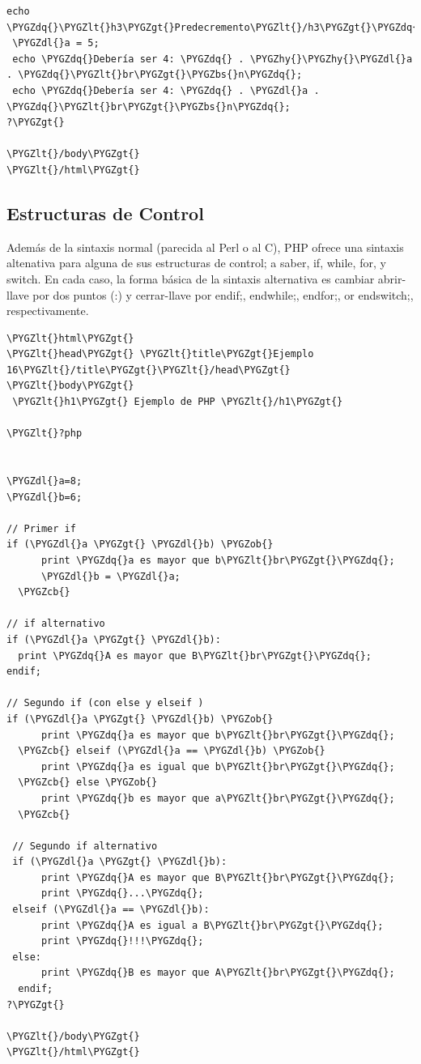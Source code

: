 \documentclass[a5paper,10pt,spanish]{sphinxmanual}
\def\PYGZbs{\char`\\}
\def\PYGZob{\char`\{}
\def\PYGZcb{\char`\}}
\def\PYGZlt{\char`\<}
\def\PYGZgt{\char`\>}
\def\PYGZdl{\char`\$}
\def\PYGZhy{\char`\-}
\def\PYGZdq{\char`\"}
\begin{document}
\begin{Verbatim}[commandchars=\\\{\}]
 echo \PYGZdq{}\PYGZlt{}h3\PYGZgt{}Predecremento\PYGZlt{}/h3\PYGZgt{}\PYGZdq{};
 \PYGZdl{}a = 5;
 echo \PYGZdq{}Debería ser 4: \PYGZdq{} . \PYGZhy{}\PYGZhy{}\PYGZdl{}a . \PYGZdq{}\PYGZlt{}br\PYGZgt{}\PYGZbs{}n\PYGZdq{};
 echo \PYGZdq{}Debería ser 4: \PYGZdq{} . \PYGZdl{}a . \PYGZdq{}\PYGZlt{}br\PYGZgt{}\PYGZbs{}n\PYGZdq{};
?\PYGZgt{}

\PYGZlt{}/body\PYGZgt{}
\PYGZlt{}/html\PYGZgt{}
\end{Verbatim}


\subsection{Estructuras de Control}
\label{Tutorial1_Conceptos.md:estructuras-de-control}
Además de la sintaxis normal (parecida al Perl o al C), PHP ofrece una
sintaxis altenativa para alguna de sus estructuras de control; a saber,
if, while, for, y switch. En cada caso, la forma básica de la sintaxis
alternativa es cambiar abrir-llave por dos puntos (:) y cerrar-llave por
endif;, endwhile;, endfor;, or endswitch;, respectivamente.

\begin{Verbatim}[commandchars=\\\{\}]
\PYGZlt{}html\PYGZgt{}
\PYGZlt{}head\PYGZgt{} \PYGZlt{}title\PYGZgt{}Ejemplo 16\PYGZlt{}/title\PYGZgt{}\PYGZlt{}/head\PYGZgt{}
\PYGZlt{}body\PYGZgt{}
 \PYGZlt{}h1\PYGZgt{} Ejemplo de PHP \PYGZlt{}/h1\PYGZgt{}

\PYGZlt{}?php


\PYGZdl{}a=8;
\PYGZdl{}b=6;

// Primer if
if (\PYGZdl{}a \PYGZgt{} \PYGZdl{}b) \PYGZob{}
      print \PYGZdq{}a es mayor que b\PYGZlt{}br\PYGZgt{}\PYGZdq{};
      \PYGZdl{}b = \PYGZdl{}a;
  \PYGZcb{}

// if alternativo
if (\PYGZdl{}a \PYGZgt{} \PYGZdl{}b):
  print \PYGZdq{}A es mayor que B\PYGZlt{}br\PYGZgt{}\PYGZdq{};
endif;

// Segundo if (con else y elseif )
if (\PYGZdl{}a \PYGZgt{} \PYGZdl{}b) \PYGZob{}
      print \PYGZdq{}a es mayor que b\PYGZlt{}br\PYGZgt{}\PYGZdq{};
  \PYGZcb{} elseif (\PYGZdl{}a == \PYGZdl{}b) \PYGZob{}
      print \PYGZdq{}a es igual que b\PYGZlt{}br\PYGZgt{}\PYGZdq{};
  \PYGZcb{} else \PYGZob{}
      print \PYGZdq{}b es mayor que a\PYGZlt{}br\PYGZgt{}\PYGZdq{};
  \PYGZcb{}

 // Segundo if alternativo
 if (\PYGZdl{}a \PYGZgt{} \PYGZdl{}b):
      print \PYGZdq{}A es mayor que B\PYGZlt{}br\PYGZgt{}\PYGZdq{};
      print \PYGZdq{}...\PYGZdq{};
 elseif (\PYGZdl{}a == \PYGZdl{}b):
      print \PYGZdq{}A es igual a B\PYGZlt{}br\PYGZgt{}\PYGZdq{};
      print \PYGZdq{}!!!\PYGZdq{};
 else:
      print \PYGZdq{}B es mayor que A\PYGZlt{}br\PYGZgt{}\PYGZdq{};
  endif;
?\PYGZgt{}

\PYGZlt{}/body\PYGZgt{}
\PYGZlt{}/html\PYGZgt{}
\end{Verbatim}
\end{document}
